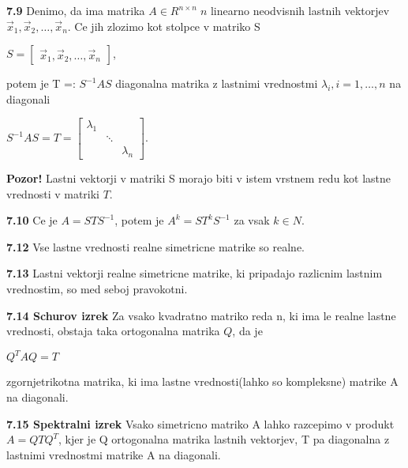 \documentclass{article}
\begin{document}
\begin{multicols}{4}
\textbf{7.9} Denimo, da ima matrika $A \in R^{n \times n}\; n$ linearno neodvisnih lastnih vektorjev
$\vec{x}_{1}, \vec{x}_{2}, \dots, \vec{x}_{n}$. Ce jih zlozimo kot stolpce v matriko S
\begin{center}
    \begin{math}
        S =
        \begin{bmatrix}
            \vec{x}_{1}, \vec{x}_{2}, \dots, \vec{x}_{n}
        \end{bmatrix}
    \end{math},
\end{center}
potem je T =: $S^{-1}AS$ diagonalna matrika z lastnimi vrednostmi $\lambda_{i}, i = 1, \dots, n$ na diagonali
\begin{center}
    \begin{math}
        S^{-1}AS = T =
        \begin{bmatrix}
            \lambda_{1} & &\\
            &   \ddots  &  \\
            & &     \lambda_{n} 
        \end{bmatrix}
    \end{math}.
\end{center}

\textbf{Pozor!} Lastni vektorji v matriki S morajo biti v istem vrstnem redu kot lastne vrednosti v matriki $T$.

\textbf{7.10} Ce je $A = STS^{-1}$, potem je $A^{k} = ST^{k}S^{-1}$ za vsak $k \in N$.

\textbf{7.12} Vse lastne vrednosti realne simetricne matrike so realne.

\textbf{7.13} Lastni vektorji realne simetricne matrike, ki pripadajo razlicnim lastnim
vrednostim, so med seboj pravokotni.

\textbf{7.14 Schurov izrek} Za vsako kvadratno matriko reda n, ki ima le realne lastne vrednosti,
obstaja taka ortogonalna matrika $Q$, da je 
\begin{center}
    \begin{math}
        Q^{T}AQ = T
    \end{math}
\end{center} 
zgornjetrikotna matrika, ki ima lastne vrednosti(lahko so kompleksne) matrike A na diagonali.

\textbf{7.15 Spektralni izrek} Vsako simetricno matriko A lahko razcepimo v produkt
$A = QTQ^{T}$, kjer je Q ortogonalna matrika lastnih vektorjev, T pa diagonalna z lastnimi
vrednostmi matrike A na diagonali.


\end{multicols}
\end{document}
